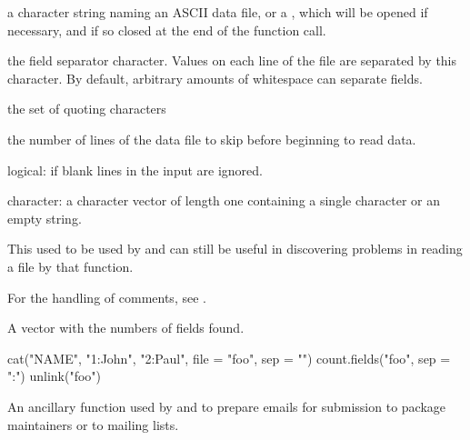 \begin{Arguments}
\begin{ldescription}
\item[\code{file}] a character string naming an ASCII data file, or a
, which will be opened if necessary,
and if so closed at the end of the function call.

\item[\code{sep}] the field separator character.  Values on each line of the
file are separated by this character.  By default, arbitrary amounts
of whitespace can separate fields.

\item[\code{quote}] the set of quoting characters

\item[\code{skip}] the number of lines of the data file to skip before
beginning to read data.

\item[\code{blank.lines.skip}] logical: if  blank lines in the
input are ignored.

\item[\code{comment.char}] character: a character vector of length one
containing a single character or an empty string.
\end{ldescription}
\end{Arguments}
%
\begin{Details}\relax
This used to be used by  and can still be
useful in discovering problems in reading a file by that function.

For the handling of comments, see .
\end{Details}
%
\begin{Value}
A vector with the numbers of fields found.
\end{Value}
%
\begin{SeeAlso}\relax
{}
\end{SeeAlso}
%
\begin{Examples}
\begin{ExampleCode}
cat("NAME", "1:John", "2:Paul", file = "foo", sep = "\n")
count.fields("foo", sep = ":")
unlink("foo")
\end{ExampleCode}
\end{Examples}
%
\begin{Description}\relax
An ancillary function used by  and
 to prepare emails for submission to package
maintainers or to \R{} mailing lists.
\end{Description}
